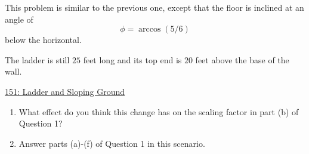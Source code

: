 \documentclass{ximera}
\begin{document}
\begin{question} \label{Qpofd9311}
This problem is similar to the previous one, except that the floor is inclined at an angle of
\[
     \phi = \arccos(5/6)
\]
below the horizontal.

The ladder is still $25$ feet long and its top end is $20$ feet above the base of the wall.

\begin{onlineOnly}
    \begin{center}
\end{center}
\end{onlineOnly}

\href{https://www.desmos.com/calculator/q2g6qqwlzc}{151: Ladder and Sloping Ground}

\begin{enumerate}

\item What effect do you think this change has on the scaling factor in part (b) of Question 1?

\item Answer parts (a)-(f) of Question 1 in this scenario.
\end{enumerate}



\end{question}
\end{document}

